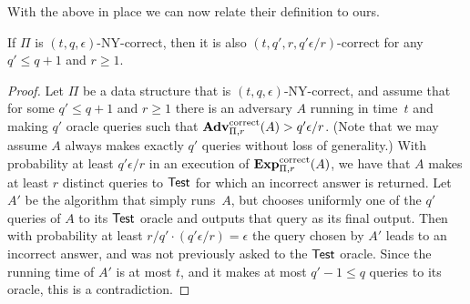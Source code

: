 With the above in place we can now relate their definition to ours.

 

\begin{theorem}
If $\Pi$ is $(t,q,\epsilon)$-NY-correct, then it is also
$(t, q', r, q'\epsilon/r)$-correct for any $q' \leq q+1$ and $r\geq
1$.
\end{theorem}
\begin{proof}
Let $\Pi$ be a data structure that is $(t,q,\epsilon)$-NY-correct,
and assume that for some $q' \leq q+1$ and
$r \geq 1$
there is an adversary $A$ running in time~$t$
and making $q'$ oracle queries such that
$\mathrm{\mathbf{Adv}}^{\mathrm{correct}}_{\Pi,r}(A) > q'\epsilon/r$.
(Note that
we may assume $A$ always makes exactly $q'$ queries without loss of generality.)
With probability at least
$q'\epsilon/r$ in an execution of $\mathrm{\mathbf{Exp}}^{\mathrm{correct}}_{\Pi,r}(A)$, we have that
$A$ makes at least $r$ distinct queries to $\mathsf{Test}$ for which
an incorrect answer is returned. Let $A'$ be the algorithm that simply
runs~$A$, but chooses
uniformly one of the $q'$ queries of $A$ to its $\mathsf{Test}$ oracle and outputs that query
as its final output. Then with probability at least $r/q' \cdot (q'\epsilon/r)=\epsilon$
the query chosen by $A'$
leads to an incorrect answer, and was not previously asked to the $\mathsf{Test}$ oracle.
Since the running time of $A'$ is at most $t$, and it makes at most $q'-1 \leq q$ queries
to its oracle, this is a contradiction.
\end{proof}


